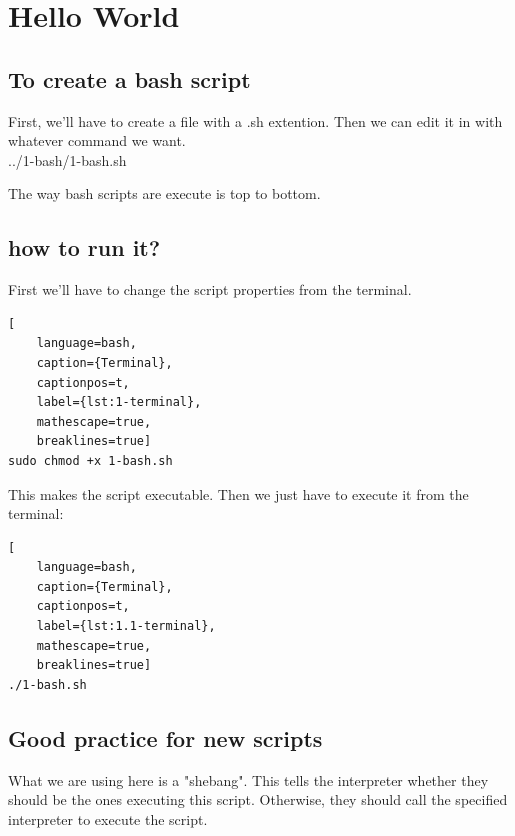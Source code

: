 \chapter{Hello World}

\section{To create a bash script}

First, we'll have to create a file with a .sh extention. Then we can edit it in with whatever command we want.\\


{../1-bash/1-bash.sh}

The way bash scripts are execute is top to bottom.

\section{how to run it?}

First we'll have to change the script properties from the terminal. \\

\begin{lstlisting}[
    language=bash, 
    caption={Terminal},
    captionpos=t, 
    label={lst:1-terminal}, 
    mathescape=true,
    breaklines=true]
sudo chmod +x 1-bash.sh
\end{lstlisting}

This makes the script executable. Then we just have to execute it from the terminal:\\

\begin{lstlisting}[
    language=bash, 
    caption={Terminal},
    captionpos=t,
    label={lst:1.1-terminal}, 
    mathescape=true, 
    breaklines=true]
./1-bash.sh
\end{lstlisting}
\newpage

\section{Good practice for new scripts}

What we are using here is a "shebang". This tells the interpreter whether they should be the ones 
executing this script. Otherwise, they should call the specified interpreter to execute the script.

